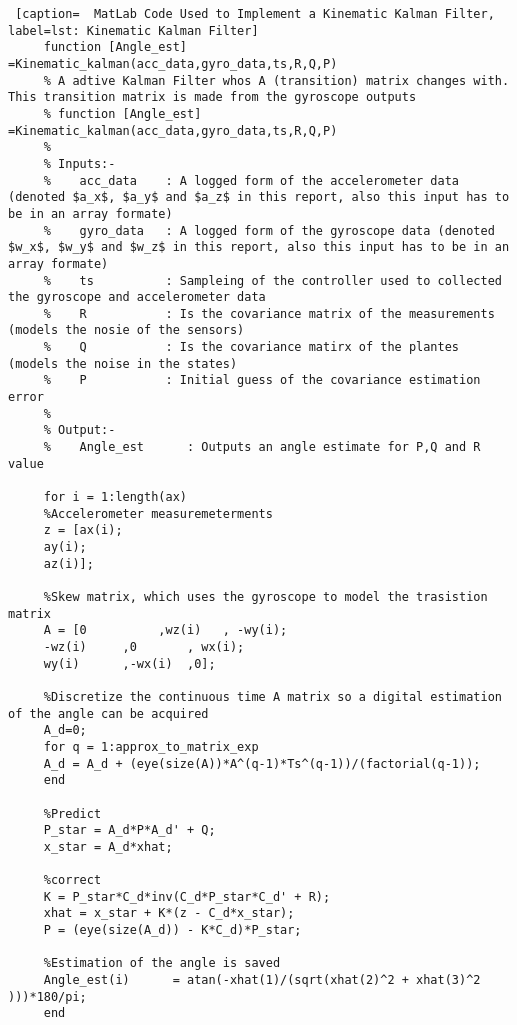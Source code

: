        \begin{lstlisting} [caption=  MatLab Code Used to Implement a Kinematic Kalman Filter, label=lst: Kinematic Kalman Filter]
     function [Angle_est] =Kinematic_kalman(acc_data,gyro_data,ts,R,Q,P) 
     % A adtive Kalman Filter whos A (transition) matrix changes with. This transition matrix is made from the gyroscope outputs
     % function [Angle_est] =Kinematic_kalman(acc_data,gyro_data,ts,R,Q,P)  
     %
     % Inputs:-
     %    acc_data    : A logged form of the accelerometer data (denoted $a_x$, $a_y$ and $a_z$ in this report, also this input has to be in an array formate)
     %    gyro_data   : A logged form of the gyroscope data (denoted $w_x$, $w_y$ and $w_z$ in this report, also this input has to be in an array formate)
     %    ts          : Sampleing of the controller used to collected the gyroscope and accelerometer data
     %    R           : Is the covariance matrix of the measurements (models the nosie of the sensors)
     %    Q           : Is the covariance matirx of the plantes      (models the noise in the states)
     %    P           : Initial guess of the covariance estimation error      
     %
     % Output:-  
     %    Angle_est      : Outputs an angle estimate for P,Q and R value
     
     for i = 1:length(ax)
     %Accelerometer measuremeterments        
     z = [ax(i);
     ay(i);
     az(i)];
     
     %Skew matrix, which uses the gyroscope to model the trasistion matrix
     A = [0          ,wz(i)   , -wy(i);
     -wz(i)     ,0       , wx(i);
     wy(i)      ,-wx(i)  ,0];
     
     %Discretize the continuous time A matrix so a digital estimation of the angle can be acquired       
     A_d=0;
     for q = 1:approx_to_matrix_exp
     A_d = A_d + (eye(size(A))*A^(q-1)*Ts^(q-1))/(factorial(q-1)); 
     end 
     
     %Predict
     P_star = A_d*P*A_d' + Q;
     x_star = A_d*xhat;
     
     %correct
     K = P_star*C_d*inv(C_d*P_star*C_d' + R);
     xhat = x_star + K*(z - C_d*x_star);
     P = (eye(size(A_d)) - K*C_d)*P_star;
     
     %Estimation of the angle is saved         
     Angle_est(i)      = atan(-xhat(1)/(sqrt(xhat(2)^2 + xhat(3)^2 )))*180/pi;
     end
    \end{lstlisting}
    
    
    
    
    
    
    
    